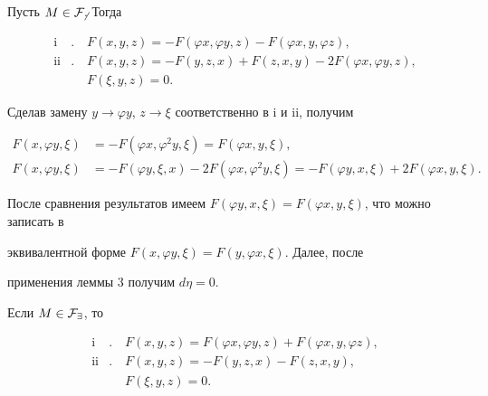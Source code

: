 \begin{pf} 


Пусть $M\in\cal F_6$. Тогда 


\begin{align*} 


\text{i}&.\quad F(x,y,z)=-F(\varphi x,\varphi y,z)- 


F(\varphi x,y,\varphi z),\\ 


\text{ii}&.\quad F(x,y,z)=-F(y,z,x)+F(z,x,y)- 


2F(\varphi x,\varphi y,z),\\ 


&\phantom{.}\quad F(\xi,y,z)=0. 


\end{align*} 


Сделав замену $y\to\varphi y$, $z\to\xi$ соответственно в i и ii, получим 


\begin{align*} 


F(x,\varphi y,\xi)&=-F(\varphi x,\varphi ^2y,\xi)= 


F(\varphi x,y,\xi),\\ 


F(x,\varphi y,\xi)&=-F(\varphi y,\xi,x)- 


2F(\varphi x,\varphi ^2y,\xi)=-F(\varphi y,x,\xi)+ 


2F(\varphi x,y,\xi). 


\end{align*} 


После сравнения результатов имеем $F(\varphi y,x,\xi)=F(\varphi 


x,y,\xi)$, что можно записать в 


эквивалентной форме $F(x,\varphi y,\xi)=F(y,\varphi x,\xi)$. Далее, после 


применения леммы 3 получим $d\eta=0$. 


 


Если $M\in\cal F_9$, то 


\begin{align*} 


\text{i}&.\quad F(x,y,z)=F(\varphi x,\varphi y,z)+ 


F(\varphi x,y,\varphi z),\\ 


\text{ii}&.\quad F(x,y,z)=-F(y,z,x)-F(z,x,y),\\ 


&\phantom{.}\quad F(\xi,y,z)=0. 



\end{align*}
\end{pf}
